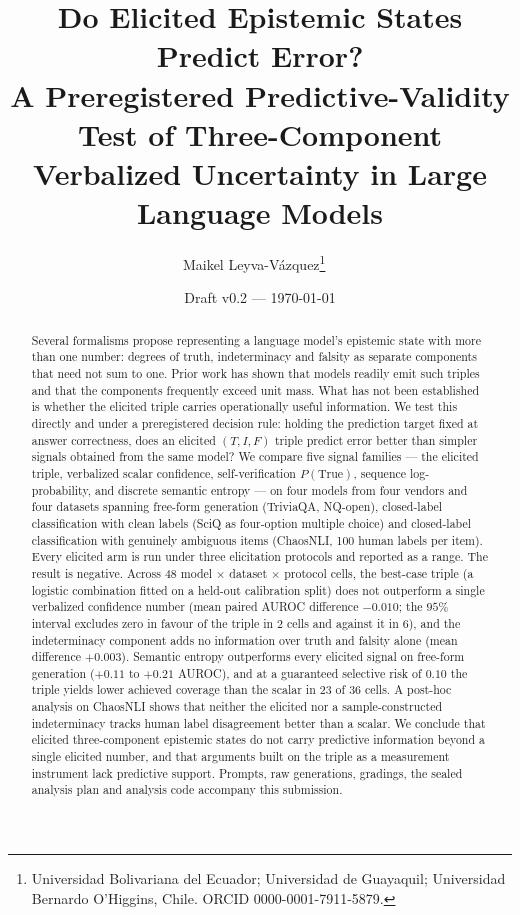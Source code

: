 \documentclass[11pt]{article}
\title{Do Elicited Epistemic States Predict Error?\\
A Preregistered Predictive-Validity Test of Three-Component Verbalized Uncertainty in Large Language Models}
\author{Maikel Leyva-V\'azquez\thanks{Universidad Bolivariana del Ecuador; Universidad de Guayaquil; Universidad Bernardo O'Higgins, Chile. ORCID 0000-0001-7911-5879.}
\ \and \TODO{coauthors}}
\date{Draft v0.2 --- \today}
\begin{document}
\maketitle

\begin{abstract}
Several formalisms propose representing a language model's epistemic state with more than one
number: degrees of truth, indeterminacy and falsity as separate components that need not sum to
one. Prior work has shown that models readily emit such triples and that the components
frequently exceed unit mass. What has not been established is whether the elicited triple carries
operationally useful information. We test this directly and under a preregistered decision rule:
holding the prediction target fixed at answer correctness, does an elicited $(T,I,F)$ triple
predict error better than simpler signals obtained from the same model? We compare five signal
families --- the elicited triple, verbalized scalar confidence, self-verification
$P(\text{True})$, sequence log-probability, and discrete semantic entropy --- on four models from
four vendors and four datasets spanning free-form generation (TriviaQA, NQ-open), closed-label
classification with clean labels (SciQ as four-option multiple choice) and closed-label
classification with genuinely ambiguous items (ChaosNLI, 100 human labels per item). Every
elicited arm is run under three elicitation protocols and reported as a range. The result is
negative. Across 48 model $\times$ dataset $\times$ protocol cells, the best-case triple
(a logistic combination fitted on a held-out calibration split) does not outperform a single
verbalized confidence number (mean paired AUROC difference $-0.010$; the $95\%$ interval excludes
zero in favour of the triple in $2$ cells and against it in $6$), and the indeterminacy component
adds no information over truth and falsity alone (mean difference $+0.003$). Semantic entropy
outperforms every elicited signal on free-form generation ($+0.11$ to $+0.21$ AUROC), and at a
guaranteed selective risk of $0.10$ the triple yields lower achieved coverage than the scalar in
$23$ of $36$ cells. A post-hoc analysis on ChaosNLI shows that neither the elicited nor a
sample-constructed indeterminacy tracks human label disagreement better than a scalar. We
conclude that elicited three-component epistemic states do not carry predictive information
beyond a single elicited number, and that arguments built on the triple as a measurement
instrument lack predictive support. Prompts, raw generations, gradings, the sealed analysis plan
and analysis code accompany this submission.
\end{abstract}
\end{document}
